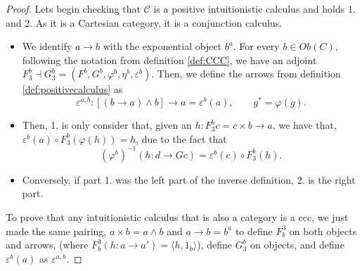 \begin{proof}
  
  Lets begin checking that $\mathcal{C}$ is a positive intuitionistic calculus and holds 1. and 2. As it is a Cartesian category, it is a conjunction calculus.
  \begin{itemize}
  \item We identify $a\to b$ with the exponential object $b^a$. For every $b\in Ob(C)$, following the notation from definition \ref{def:CCC}, we have an adjoint $F_3^b\dashv G_3^b = (F^b,G^b,\varphi^b,\eta^b,\varepsilon^b)$. Then, we define the arrows from definition \ref{def:positivecalculus} as
    $$\varepsilon^{a,b}: [(b \to a) \land b]\to a = \varepsilon^b(a), \qquad g^* = \varphi(g).$$
  \item Then, 1. is only consider that, given an $h: F_3^b c = c\times b \to a$, we have that, $\varepsilon^b(a) \circ F_3^b(\varphi(h)) = h$, due to the fact that $$(\varphi^b)^{-1}(h: d \to Gc) = \varepsilon^b(c)\circ F_3^b(h).$$
  \item Conversely, if part 1. was the left part of the inverse definition, 2. is the right part.
  \end{itemize}

  To prove that any intuitionistic calculus that is also a category is a ccc, we just made the same pairing, $a\times b = a\land b$ and $a\to b = b^a$ to define $F_b^3$ on both objects and arrows, (where $F_b^3(h:a\to a') = \langle h, 1_b\rangle $), define $G_3^b$ on objects, and define $\varepsilon^b(a)$ as $\varepsilon^{a,b}$.











\end{proof}
